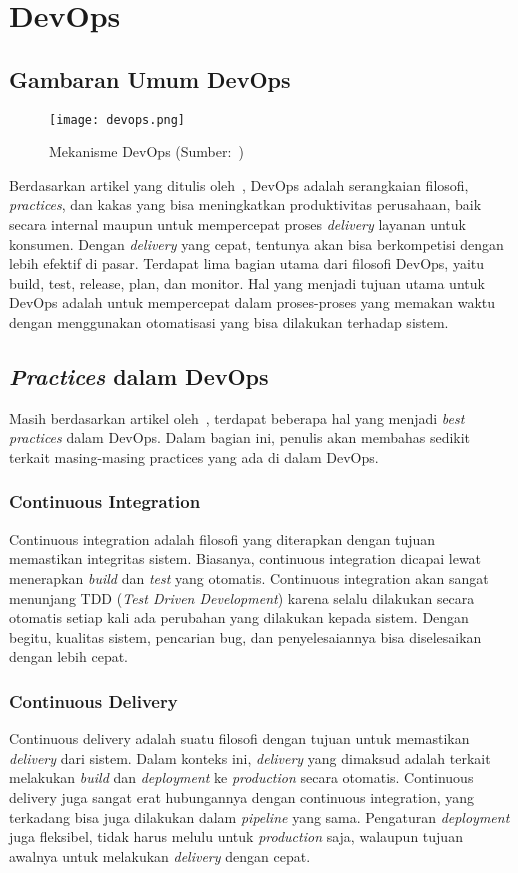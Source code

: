 \section{DevOps}

\subsection{Gambaran Umum DevOps}
\begin{figure}[h]
  \centering
  \texttt{[image: devops.png]}
  \caption{Mekanisme DevOps (Sumber:~\cite{devops})}
\end{figure}
Berdasarkan artikel yang ditulis oleh~\cite{devops}, DevOps adalah serangkaian filosofi, \textit{practices}, dan kakas yang bisa meningkatkan produktivitas perusahaan, baik secara internal maupun untuk mempercepat proses \textit{delivery} layanan untuk konsumen.
Dengan \textit{delivery} yang cepat, tentunya akan bisa berkompetisi dengan lebih efektif di pasar.
Terdapat lima bagian utama dari filosofi DevOps, yaitu build, test, release, plan, dan monitor.
Hal yang menjadi tujuan utama untuk DevOps adalah untuk mempercepat dalam proses-proses yang memakan waktu dengan menggunakan otomatisasi yang bisa dilakukan terhadap sistem.

\subsection{\textit{Practices} dalam DevOps}
Masih berdasarkan artikel oleh~\cite{devops}, terdapat beberapa hal yang menjadi \textit{best practices} dalam DevOps. 
Dalam bagian ini, penulis akan membahas sedikit terkait masing-masing practices yang ada di dalam DevOps.

\subsubsection{Continuous Integration}
Continuous integration adalah filosofi yang diterapkan dengan tujuan memastikan integritas sistem.
Biasanya, continuous integration dicapai lewat menerapkan \textit{build} dan \textit{test} yang otomatis.
Continuous integration akan sangat menunjang TDD (\textit{Test Driven Development}) karena selalu dilakukan secara otomatis setiap kali ada perubahan yang dilakukan kepada sistem.
Dengan begitu, kualitas sistem, pencarian bug, dan penyelesaiannya bisa diselesaikan dengan lebih cepat.


\subsubsection{Continuous Delivery}
Continuous delivery adalah suatu filosofi dengan tujuan untuk memastikan \textit{delivery} dari sistem.
Dalam konteks ini, \textit{delivery} yang dimaksud adalah terkait melakukan \textit{build} dan \textit{deployment} ke \textit{production} secara otomatis.
Continuous delivery juga sangat erat hubungannya dengan continuous integration, yang terkadang bisa juga dilakukan dalam \textit{pipeline} yang sama.
Pengaturan \textit{deployment} juga fleksibel, tidak harus melulu untuk \textit{production} saja, walaupun tujuan awalnya untuk melakukan \textit{delivery} dengan cepat.

